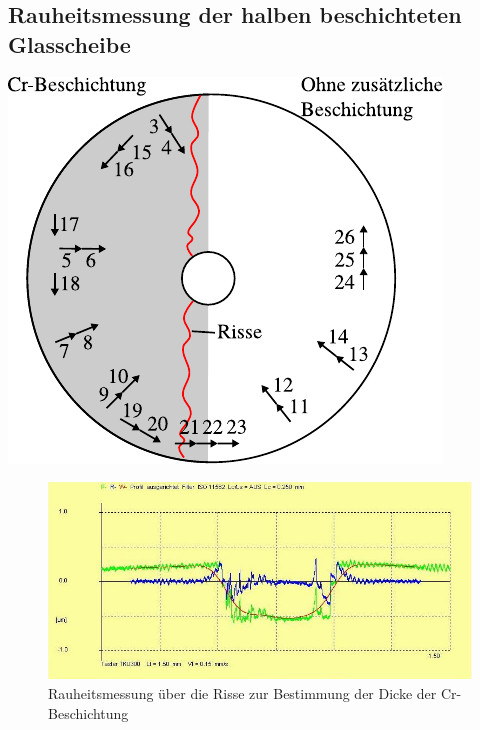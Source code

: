 \begin{appendices}
    \section{Rauheitsmessung der halben beschichteten Glasscheibe}
    \begin{minipage}[c]{0.5\linewidth}
        \centering
        \includegraphics[width=\textwidth]{./images/rauheitsmessung.pdf}
        \label{fig:messstelle_zur_rauheitsbestimmung}
    \end{minipage}
    \begin{minipage}[c]{0.5\linewidth}
        
    \end{minipage}

    \begin{figure}[htb]
        \centering
        \includegraphics[width=\linewidth]{./images/rauheit_messung_21_plot.jpg}
        \caption{Rauheitsmessung über die Risse zur Bestimmung der Dicke der Cr-Beschichtung}
        \label{fig:rauheitsmessung_ueber_der_risse}
    \end{figure}


\end{appendices}
